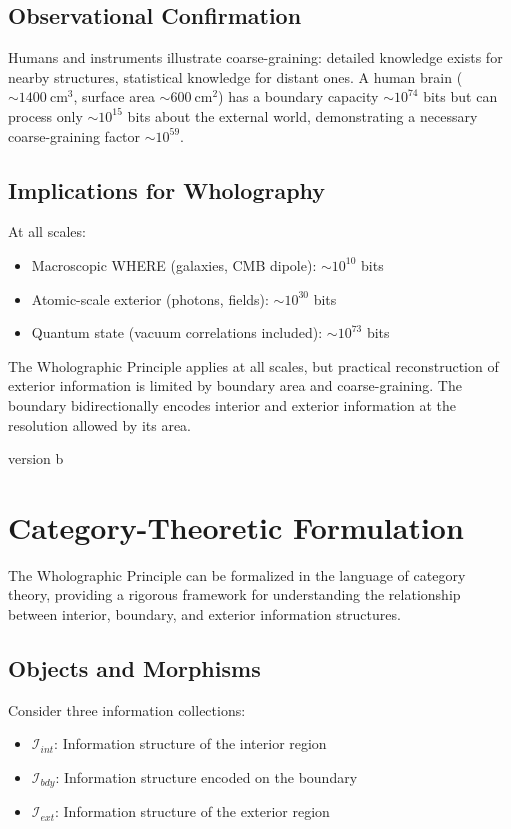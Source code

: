 ﻿\documentclass[12pt]{article}
\begin{document}
\subsection{Observational Confirmation}


Humans and instruments illustrate coarse-graining: detailed knowledge exists for nearby structures, statistical knowledge for distant ones. A human brain ($\sim 1400~\mathrm{cm^3}$, surface area $\sim 600~\mathrm{cm^2}$) has a boundary capacity $\sim 10^{74}$ bits but can process only $\sim 10^{15}$ bits about the external world, demonstrating a necessary coarse-graining factor $\sim 10^{59}$.


\subsection{Implications for Wholography}


At all scales:
\begin{itemize}
    \item Macroscopic WHERE (galaxies, CMB dipole): $\sim 10^{10}$ bits
    \item Atomic-scale exterior (photons, fields): $\sim 10^{30}$ bits
    \item Quantum state (vacuum correlations included): $\sim 10^{73}$ bits
\end{itemize}


The Wholographic Principle applies at all scales, but practical reconstruction of exterior information is limited by boundary area and coarse-graining. The boundary bidirectionally encodes interior and exterior information at the resolution allowed by its area.






\appendix version b


\section{Category-Theoretic Formulation}
The Wholographic Principle can be formalized in the language of category theory, providing a rigorous framework for understanding the relationship between interior, boundary, and exterior information structures.


\subsection*{Objects and Morphisms}
Consider three information collections:
\begin{itemize}
    \item $\mathcal{I}_{int}$: Information structure of the interior region
    \item $\mathcal{I}_{bdy}$: Information structure encoded on the boundary
    \item $\mathcal{I}_{ext}$: Information structure of the exterior region
\end{itemize}
\end{document}
